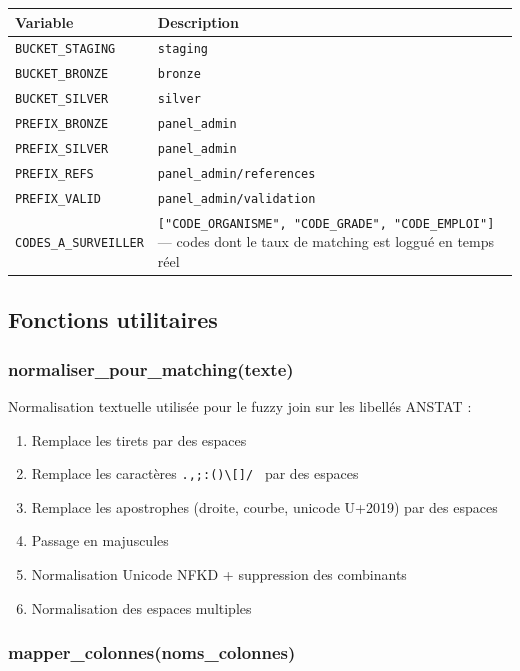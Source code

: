 \documentclass[12pt,a4paper,french]{report}
\begin{document}
\begin{tabularx}{\textwidth}{lX}
  \toprule
  \textbf{Variable} & \textbf{Description} \\
  \midrule
  \texttt{BUCKET\_STAGING} & \texttt{staging} \\
  \texttt{BUCKET\_BRONZE} & \texttt{bronze} \\
  \texttt{BUCKET\_SILVER} & \texttt{silver} \\
  \texttt{PREFIX\_BRONZE} & \texttt{panel\_admin} \\
  \texttt{PREFIX\_SILVER} & \texttt{panel\_admin} \\
  \texttt{PREFIX\_REFS} & \texttt{panel\_admin/references} \\
  \texttt{PREFIX\_VALID} & \texttt{panel\_admin/validation} \\
  \texttt{CODES\_A\_SURVEILLER} &
    \texttt{["CODE\_ORGANISME", "CODE\_GRADE", "CODE\_EMPLOI"]} ---
    codes dont le taux de matching est loggué en temps réel \\
  \bottomrule
\end{tabularx}

\subsection{Fonctions utilitaires}

\subsubsection{normaliser\_pour\_matching(texte)}

Normalisation textuelle utilisée pour le fuzzy join sur les libellés ANSTAT :
\begin{enumerate}[nosep]
  \item Remplace les tirets par des espaces
  \item Remplace les caractères \texttt{.,;:()\textbackslash[]/ } par des
        espaces
  \item Remplace les apostrophes (droite, courbe, unicode U+2019) par des
        espaces
  \item Passage en majuscules
  \item Normalisation Unicode NFKD + suppression des combinants
  \item Normalisation des espaces multiples
\end{enumerate}

\subsubsection{mapper\_colonnes(noms\_colonnes)}
\end{document}
